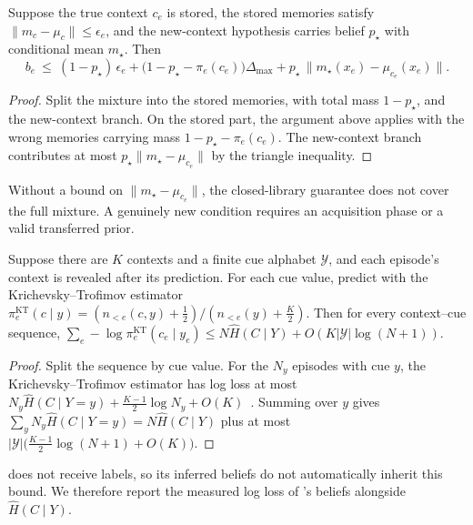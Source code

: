 \begin{corollary}\label{cor:novel}
Suppose the true context $c_e$ is stored, the stored memories satisfy $\|m_c-\mu_c\|\le\epsilon_e$, and the new-context hypothesis carries belief $p_\star$ with conditional mean $m_\star$. Then
\[
  b_e\ \le\ (1-p_\star)\,\epsilon_e+\big(1-p_\star-\pi_e(c_e)\big)\Delta_{\max}+p_\star\,\|m_\star(x_e)-\mu_{c_e}(x_e)\|.
\]
\end{corollary}
\begin{proof}
Split the mixture into the stored memories, with total mass $1-p_\star$, and the new-context branch. On the stored part, the argument above applies with the wrong memories carrying mass $1-p_\star-\pi_e(c_e)$. The new-context branch contributes at most $p_\star\|m_\star-\mu_{c_e}\|$ by the triangle inequality.
\end{proof}
Without a bound on $\|m_\star-\mu_{c_e}\|$, the closed-library guarantee does not cover the full mixture. A genuinely new condition requires an acquisition phase or a valid transferred prior.

\begin{corollary}\label{cor:entropy}
Suppose there are $K$ contexts and a finite cue alphabet $\mathcal Y$, and each episode's context is revealed after its prediction. For each cue value, predict with the Krichevsky--Trofimov estimator $\pi^{\mathrm{KT}}_e(c\mid y)=(n_{<e}(c,y)+\tfrac12)/(n_{<e}(y)+\tfrac K2)$. Then for every context--cue sequence, $\sum_e-\log\pi^{\mathrm{KT}}_e(c_e\mid y_e)\le N\widehat H(C\mid Y)+O(K|\mathcal Y|\log(N+1))$.
\end{corollary}
\begin{proof}
Split the sequence by cue value. For the $N_y$ episodes with cue $y$, the Krichevsky--Trofimov estimator has log loss at most $N_y\widehat H(C\mid Y=y)+\tfrac{K-1}{2}\log N_y+O(K)$~\citep{krichevsky1981performance}. Summing over $y$ gives $\sum_yN_y\widehat H(C\mid Y=y)=N\widehat H(C\mid Y)$ plus at most $|\mathcal Y|\big(\tfrac{K-1}{2}\log(N+1)+O(K)\big)$.
\end{proof}
\method does not receive labels, so its inferred beliefs do not automatically inherit this bound. We therefore report the measured log loss of \method's beliefs alongside $\widehat H(C\mid Y)$.

